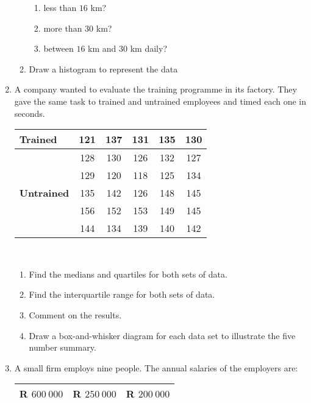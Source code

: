 \begin{eocexercises}{}
\begin{enumerate}[itemsep=6pt, label=\textbf{\arabic*}.]
\begin{enumerate}[noitemsep, label=\textbf{(\alph*)} ]
\begin{enumerate}[noitemsep, label=\textbf{\roman*}. ]
      \item less than $16$ km?
      \item more than $30$ km?
      \item between $16$ km and $30$ km daily?
      \end{enumerate}
\item Draw a histogram to represent the data
    \end{enumerate}
  \item A company wanted to evaluate the training programme in its
    factory. They gave the same task to trained and untrained
    employees and timed each one in seconds.
\\
    \begin{center}
      \begin{tabular}{|l|c|c|c|c|c|} \hline
        \textbf{Trained} & 121 & 137 & 131 & 135 & 130 \\ \hline
                         & 128 & 130 & 126 & 132 & 127 \\\hline
                         & 129 & 120 & 118 & 125 & 134 \\\hline
        \textbf{Untrained} & 135 & 142 & 126 & 148 & 145 \\\hline
                           & 156 & 152 & 153 & 149 & 145 \\\hline
                           & 144 & 134 & 139 & 140 & 142 \\\hline
      \end{tabular}
    \end{center}
\vspace {8pt}\\
    \begin{enumerate}[noitemsep, label=\textbf{(\alph*)} ]
    \item Find the medians and quartiles for both sets of data.
    \item Find the interquartile range for both sets of data.
    \item Comment on the results.
    \item Draw a box-and-whisker diagram for each data set to illustrate the five number summary.
    \end{enumerate}
  \item A small firm employs nine people. The annual salaries of the employers are:
\\
    \begin{center}
      \begin{tabular}{|r|r|r|} \hline
        R $600~ 000$ & R $250~ 000$ & R $200~ 000$ \\\hline

\end{tabular}
\end{center}
\end{enumerate}
\end{eocexercises}
